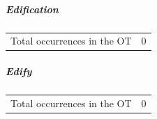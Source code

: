 			\subparagraph{Edification}
	
				\begin{tabular}{ll}
					Total occurrences in the OT & 0
				\end{tabular}
				
				
			\subparagraph{Edify}
	
				\begin{tabular}{ll}
					Total occurrences in the OT & 0
				\end{tabular}
			
			
		
			
				
			
